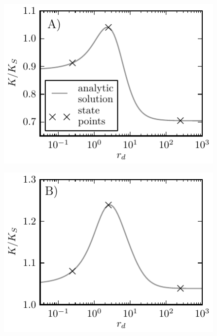 \begin{minipage}[t]{0.5 \textwidth}
    \begin{figure}[H]
        \hspace{-0.05 \textwidth}\includegraphics[width = 1.05 \textwidth]{plots/rb_rate.pdf}
    \end{figure}
\end{minipage}\begin{minipage}[t]{0.5 \textwidth}
    \begin{figure}[H]
        \includegraphics[width = 1.05 \textwidth]{plots/ab_rate.pdf}
    \end{figure}
\end{minipage}
\vspace{-0.3 cm}\\
